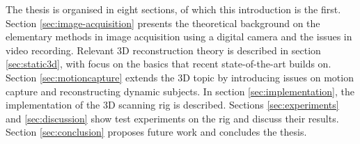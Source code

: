 The thesis is organised in eight sections, of which this introduction is the first.
Section \ref{sec:image-acquisition} presents the theoretical background on the elementary methods in image acquisition using a digital camera and the issues in video recording.
Relevant 3D reconstruction theory is described in section \ref{sec:static3d}, with focus on the basics that recent state-of-the-art builds on.
Section \ref{sec:motioncapture} extends the 3D topic by introducing issues on motion capture and reconstructing dynamic subjects.
In section \ref{sec:implementation}, the implementation of the 3D scanning rig is described.
Sections \ref{sec:experiments} and \ref{sec:discussion} show test experiments on the rig and discuss their results.
Section \ref{sec:conclusion} proposes future work and concludes the thesis.
